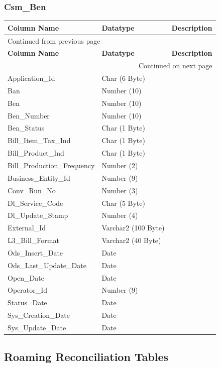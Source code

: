 \documentclass[12pt,twoside]{article}
\begin{document}
\normalsize
\subsubsection{Csm\_Ben}
\label{sec:orgheadline146}
\footnotesize

\begin{longtable}{l|l|l}
\hline
\textbf{Column Name} & \textbf{Datatype} & \textbf{Description}\\
\hline
\endfirsthead
\multicolumn{3}{l}{Continued from previous page} \\
\hline

\textbf{Column Name} & \textbf{Datatype} & \textbf{Description} \\

\hline
\endhead
\hline\multicolumn{3}{r}{Continued on next page} \\
\endfoot
\endlastfoot
\hline
Application\_Id & Char (6 Byte) & \\
Ban & Number (10) & \\
Ben & Number (10) & \\
Ben\_Number & Number (10) & \\
Ben\_Status & Char (1 Byte) & \\
Bill\_Item\_Tax\_Ind & Char (1 Byte) & \\
Bill\_Product\_Ind & Char (1 Byte) & \\
Bill\_Production\_Frequency & Number (2) & \\
Business\_Entity\_Id & Number (9) & \\
Conv\_Run\_No & Number (3) & \\
Dl\_Service\_Code & Char (5 Byte) & \\
Dl\_Update\_Stamp & Number (4) & \\
External\_Id & Varchar2 (100 Byte) & \\
L3\_Bill\_Format & Varchar2 (40 Byte) & \\
Ods\_Insert\_Date & Date & \\
Ods\_Last\_Update\_Date & Date & \\
Open\_Date & Date & \\
Operator\_Id & Number (9) & \\
Status\_Date & Date & \\
Sys\_Creation\_Date & Date & \\
Sys\_Update\_Date & Date & \\
\hline
\end{longtable}
\normalsize
\subsection{Roaming Reconciliation Tables}
\label{sec:orgheadline149}
\end{document}
